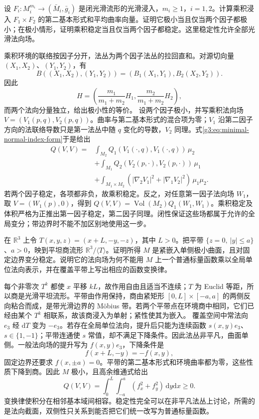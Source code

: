 \begin{exercise}\label{g3:ex:product-minimal-stability}
	设 \(F_i:M_i^{m_i}\to(\bar M_i,\bar g_i)\) 是闭光滑流形的光滑浸入，\(m_i\ge1\)，\(i=1,2\)。计算乘积浸入 \(F_1\times F_2\) 的第二基本形式和平均曲率向量。证明它极小当且仅当两个因子都极小；在极小情形，证明乘积稳定当且仅当两个因子都稳定。这里稳定性允许全部光滑法向场。
\end{exercise}
\begin{solution}
	乘积环境的联络按因子分开，法丛为两个因子法丛的拉回直和。对源切向量 \((X_1,X_2)\)、\((Y_1,Y_2)\)，有
	\[
		B((X_1,X_2),(Y_1,Y_2))=(B_1(X_1,Y_1),B_2(X_2,Y_2)).
	\]
	因此
	\[
		H=\left(\frac{m_1}{m_1+m_2}H_1,
		\frac{m_2}{m_1+m_2}H_2\right),
	\]
	而两个法向分量独立，给出极小性的等价。
	设两个因子极小，并写乘积法向场 \(V=(V_1(p,q),V_2(p,q))\)。曲率与第二基本形式的混合项为零；\(V_1\) 沿第二因子方向的法联络导数只是第一法丛中随 \(q\) 变化的导数，\(V_2\) 同理。式\eqref{g3:eq:minimal-normal-index-form}于是给出
	\[
	\begin{aligned}
		Q(V,V)={}&\int_{M_2}Q_1(V_1(\cdot,q),V_1(\cdot,q))\,\mu_2\\
		&+\int_{M_1}Q_2(V_2(p,\cdot),V_2(p,\cdot))\,\mu_1\\
		&+\int_{M_1\times M_2}(|\nabla_2V_1|^2+|\nabla_1V_2|^2)\,\mu_1\mu_2.
	\end{aligned}
	\]
	若两个因子稳定，各项都非负，故乘积稳定。反之，对任意第一因子法向场 \(W_1\)，取 \(V=(W_1(p),0)\)，得到 \(Q(V,V)=\operatorname{Vol}(M_2)Q_1(W_1,W_1)\)。乘积稳定及体积严格为正推出第一因子稳定，第二因子同理。闭性保证这些场都属于允许的全局变分；带边界时不能不加区别地使用这一步。
\end{solution}

\begin{exercise}\label{g3:ex:one-sided-flat-minimal-band}
	在 \(\mathbb R^3\) 上令 \(T(x,y,z)=(x+L,-y,-z)\)，其中 \(L>0\)。把平带 \(\{z=0,\ |y|\le a\}\)、\(a>0\)，映到平坦商流形 \(\mathbb R^3/\langle T\rangle\)。证明所得 \(M\) 是紧嵌入单侧极小曲面，且对固定边界变分稳定。说明它的法向场为何不能用 \(M\) 上一个普通标量函数乘以全局单位法向表示，并在覆盖平带上写出相应的函数变换律。
\end{exercise}
\begin{solution}
	每个非零次 \(T^k\) 都使 \(x\) 平移 \(kL\)，故作用自由且适当不连续；\(T\) 为 Euclid 等距，所以商是光滑平坦流形。平带由作用保持，商由紧矩形 \([0,L]\times[-a,a]\) 的两侧反向粘合而成，是带光滑边界的 Möbius 带。若两个平带点在环境商中相同，它们已经由某个 \(T^k\) 相联系，故该商浸入为单射；紧性使其为嵌入。
	覆盖空间中常法向 \(e_3\) 经 \(\mathrm dT\) 变为 \(-e_3\)。若存在全局单位法向，提升后只能为连续函数 \(s(x,y)e_3\)、\(s\in\{1,-1\}\)；平带连通使 \(s\) 常值，却不满足下降条件。因此法丛非平凡，曲面单侧。一般法向场的提升写为 \(f(x,y)e_3\)，下降条件是
	\[
		f(x+L,-y)=-f(x,y),
	\]
	固定边界还要求 \(f(x,\pm a)=0\)。平带的第二基本形式和环境曲率都为零，这些性质下降到商。因此 \(M\) 极小，且高余维通式给出
	\[
		Q(V,V)=\int_0^L\int_{-a}^a(f_x^2+f_y^2)\,\mathrm dy\mathrm dx\ge0.
	\]
	变换律使积分在相邻基本域间相容。稳定性完全可以在非平凡法丛上讨论，所需的是法向截面，双侧性只关系到能否把它们统一改写为普通标量函数。
\end{solution}

